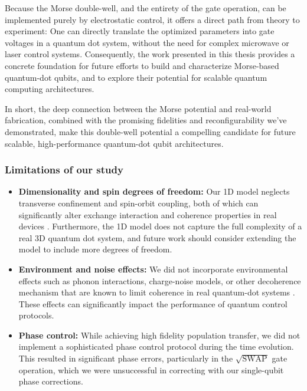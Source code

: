 \documentclass{subfiles}
\begin{document}
Because the Morse double-well, and the entirety of the gate operation, can be implemented purely by electrostatic control, it offers a direct path from theory to experiment: One can directly translate the optimized parameters into gate voltages in a quantum dot system, without the need for complex microwave or laser control systems. Consequently, the work presented in this thesis provides a concrete foundation for future efforts to build and characterize Morse-based quantum-dot qubits, and to explore their potential for scalable quantum computing architectures. 

In short, the deep connection between the Morse potential and real-world fabrication, combined with the promising fidelities and reconfigurability we've demonstrated, make this double-well potential a compelling candidate for future scalable, high-performance quantum-dot qubit architectures. 

\subsubsection*{Limitations of our study}
\begin{itemize}
    \item \textbf{Dimensionality and spin degrees of freedom:} Our 1D model neglects transverse confinement and spin-orbit coupling, both of which can significantly alter exchange interaction and coherence properties in real devices \cite{kuhlmann2013charge, yoneda2018quantum}. Furthermore, the 1D model does not capture the full complexity of a real 3D quantum dot system, and future work should consider extending the model to include more degrees of freedom.
    \item \textbf{Environment and noise effects:} We did not incorporate environmental effects such as phonon interactions, charge-noise models, or other decoherence mechanism that are known to limit coherence in real quantum-dot systems \cite{jacak2013quantum, nielsen2010quantum}. These effects can significantly impact the performance of quantum control protocols.
    \item \textbf{Phase control:} While achieving high fidelity population transfer, we did not implement a sophisticated phase control protocol during the time evolution. This resulted in significant phase errors, particularly in the $\sqrt{\text{SWAP}}$ gate operation, which we were unsuccessful in correcting with our single-qubit phase corrections. 
\end{itemize}
\end{document}
